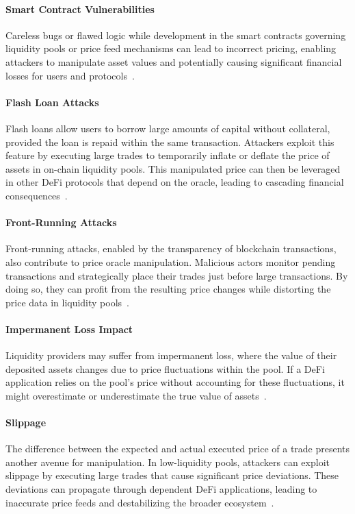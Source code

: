 \paragraph{Smart Contract Vulnerabilities} Careless bugs or flawed logic while development in the smart contracts governing liquidity pools or price feed mechanisms can lead to incorrect pricing, enabling attackers to manipulate asset values and potentially causing significant financial losses for users and protocols~\cite{gao2024unveiling}.

\paragraph{Flash Loan Attacks} Flash loans allow users to borrow large amounts of capital without collateral, provided the loan is repaid within the same transaction. Attackers exploit this feature by executing large trades to temporarily inflate or deflate the price of assets in on-chain liquidity pools. This manipulated price can then be leveraged in other DeFi protocols that depend on the oracle, leading to cascading financial consequences~\cite{zhang2023demystifying}.


\paragraph{Front-Running Attacks} Front-running attacks, enabled by the transparency of blockchain transactions, also contribute to price oracle manipulation. Malicious actors monitor pending transactions and strategically place their trades just before large transactions. By doing so, they can profit from the resulting price changes while distorting the price data in liquidity pools~\cite{zhang2023demystifying}.

\paragraph{Impermanent Loss Impact} Liquidity providers may suffer from impermanent loss, where the value of their deposited assets changes due to price fluctuations within the pool. If a DeFi application relies on the pool's price without accounting for these fluctuations, it might overestimate or underestimate the true value of assets~\cite{labadie2022impermanent}.

\paragraph{Slippage} The difference between the expected and actual executed price of a trade presents another avenue for manipulation. In low-liquidity pools, attackers can exploit slippage by executing large trades that cause significant price deviations. These deviations can propagate through dependent DeFi applications, leading to inaccurate price feeds and destabilizing the broader ecosystem~\cite{labadie2022impermanent}.


